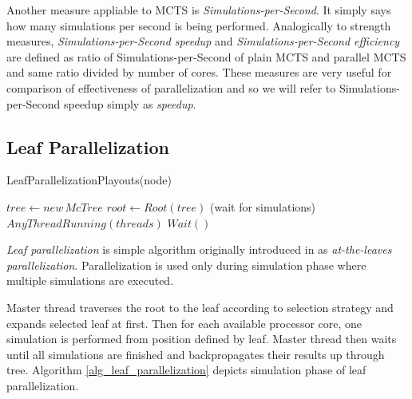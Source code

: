 Another measure appliable to MCTS is \emph{Simulations-per-Second}. It simply says how many
simulations per second is being performed. Analogically to strength measures,
\emph{Simulations-per-Second speedup} and \emph{Simulations-per-Second efficiency} are defined
as ratio of Simulations-per-Second of plain MCTS and parallel MCTS and same ratio divided by
number of cores. These measures are very useful for comparison of effectiveness of
parallelization and so we will refer to Simulations-per-Second speedup simply as
\emph{speedup}. 





\subsection{Leaf Parallelization}
\label{sec_leaf_parallelization}

\begin{algorithm}
\DontPrintSemicolon
\caption{LeafParallelizationPlayouts(node)}
\label{alg_leaf_parallelization}

$tree \leftarrow new\,McTree$ \;
$root \leftarrow Root(tree)$\;
\While(wait for simulations){$AnyThreadRunning(threads)$}{
    $Wait()$\;
}
\end{algorithm}

\emph{Leaf parallelization} is simple algorithm originally introduced in \cite{Cazenave2007} as
\emph{at-the-leaves parallelization}. Parallelization is used only during simulation phase where
multiple simulations are executed. 

Master thread traverses the root to the leaf according to selection strategy and expands selected
leaf at first. Then for each available processor core, one simulation is performed from position
defined by leaf. Master thread then waits until all simulations are finished and backpropagates
their results up through tree. Algorithm \ref{alg_leaf_parallelization} depicts simulation phase 
of leaf parallelization. 

